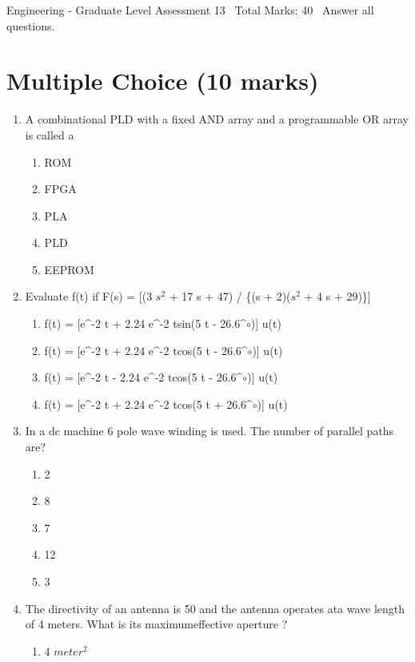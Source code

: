 \documentclass[12pt]{article}
\begin{document}
\begin{center}
Engineering - Graduate Level Assessment 13 \
Total Marks: 40 \
Answer all questions.
\end{center}

\section*{Multiple Choice (10 marks)}
\begin{enumerate}[label=\arabic*.]
\item A combinational PLD with a fixed AND array and a programmable OR array is called a
\begin{enumerate}[label=(\alph*)]
    \item ROM
    \item FPGA
    \item PLA
    \item PLD
    \item EEPROM
\end{enumerate}
\item Evaluate f(t) if F(s) = [(3 $s^2$ + 17 s + 47) / \{(s + 2)($s^2$ + 4 s + 29)\}]
\begin{enumerate}[label=(\alph*)]
    \item f(t) = [e^-2 t + 2.24 e^-2 tsin(5 t - 26.6^\ensuremath{\circ})] u(t)
    \item f(t) = [e^-2 t + 2.24 e^-2 tcos(5 t - 26.6^\ensuremath{\circ})] u(t)
    \item f(t) = [e^-2 t - 2.24 e^-2 tcos(5 t - 26.6^\ensuremath{\circ})] u(t)
    \item f(t) = [e^-2 t + 2.24 e^-2 tcos(5 t + 26.6^\ensuremath{\circ})] u(t)
\end{enumerate}
\item In a dc machine 6 pole wave winding is used. The number of parallel paths are?
\begin{enumerate}[label=(\alph*)]
    \item 2
    \item 8
    \item 7
    \item 12
    \item 3
\end{enumerate}
\item The directivity of an antenna is 50 and the antenna operates ata wave length of 4 meters. What is its maximumeffective aperture ?
\begin{enumerate}[label=(\alph*)]
    \item 4 $meter^2$

\end{enumerate}
\end{enumerate}
\end{document}
